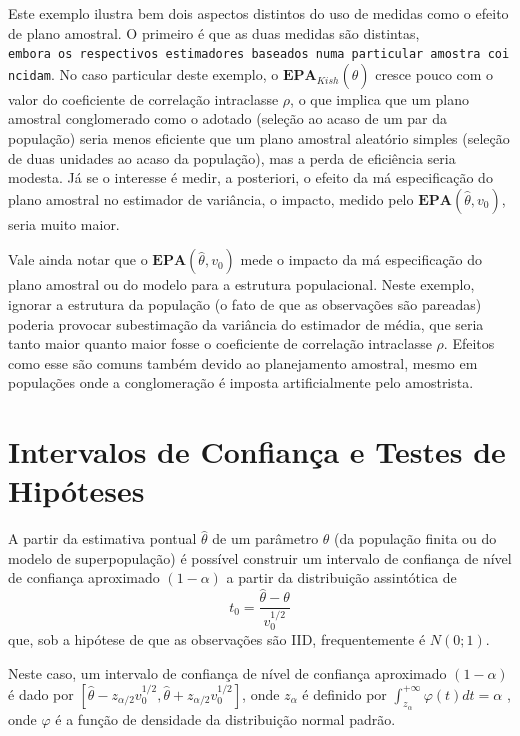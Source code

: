 \documentclass[]{book}
\theoremstyle{definition}
\theoremstyle{definition}
\theoremstyle{definition}
\theoremstyle{remark}
\begin{document}
Este exemplo ilustra bem dois aspectos distintos do uso de medidas como
o efeito de plano amostral. O primeiro é que as duas medidas são
distintas,
\texttt{embora\ os\ respectivos\ estimadores\ baseados\ numa\ particular\ amostra\ coincidam}.
No caso particular deste exemplo, o
\(\mathbf{EPA}_{Kish}\left( \hat{\theta}\right)\) cresce pouco com o
valor do coeficiente de correlação intraclasse \(\rho\), o que implica
que um plano amostral conglomerado como o adotado (seleção ao acaso de
um par da população) seria menos eficiente que um plano amostral
aleatório simples (seleção de duas unidades ao acaso da população), mas
a perda de eficiência seria modesta. Já se o interesse é medir, a
posteriori, o efeito da má especificação do plano amostral no estimador
de variância, o impacto, medido pelo
\(\mathbf{EPA}\left( \hat{\theta},v_{0}\right)\), seria muito maior.

Vale ainda notar que o \(\mathbf{EPA}\left( \hat{\theta},v_{0}\right)\)
mede o impacto da má especificação do plano amostral ou do modelo para a
estrutura populacional. Neste exemplo, ignorar a estrutura da população
(o fato de que as observações são pareadas) poderia provocar
subestimação da variância do estimador de média, que seria tanto maior
quanto maior fosse o coeficiente de correlação intraclasse \(\rho\).
Efeitos como esse são comuns também devido ao planejamento amostral,
mesmo em populações onde a conglomeração é imposta artificialmente pelo
amostrista.

\section{Intervalos de Confiança e Testes de
Hipóteses}\label{intervalos-de-confianca-e-testes-de-hipoteses}

A partir da estimativa pontual \(\hat{\theta}\) de um parâmetro
\(\theta\) (da população finita ou do modelo de superpopulação) é
possível construir um intervalo de confiança de nível de confiança
aproximado \(\left( 1-\alpha \right)\) a partir da distribuição
assintótica de \[
t_{0}=\frac{\hat{\theta}-\theta }{v_{0}^{1/2}} 
\] que, sob a hipótese de que as observações são IID, frequentemente é
\(N\left( 0;1\right)\).

Neste caso, um intervalo de confiança de nível de confiança aproximado
\(\left( 1-\alpha \right)\) é dado por
\(\left[ \hat{\theta}-z_{\alpha /2}v_{0}^{1/2},\hat{\theta}+z_{\alpha /2}v_{0}^{1/2}\right]\),
onde \(z_{\alpha }\) é definido por
\(\int_{z_{\alpha }}^{+\infty }\varphi\left( t\right) dt=\alpha\) , onde
\(\varphi\) é a função de densidade da distribuição normal padrão.
\end{document}
